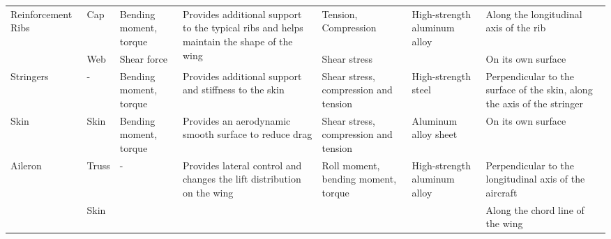 \begin{table}
{\begin{tabular}{lllllll}
    \midrule
    \multirow{2}{*}{Reinforcement Ribs} & Cap      & Bending moment, torque & \multirow{2}{*}{Provides additional support to the typical ribs and helps maintain the shape of the wing}              & Tension, Compression                                 & \multirow{2}{*}{High-strength aluminum alloy} & Along the longitudinal axis of the rib                                   \\
                                        & Web      & Shear force            &                                                                                                                        & Shear stress                                         &                                               & On its own surface                                                       \\
    \midrule
    Stringers                           & -        & Bending moment, torque & Provides additional support and stiffness to the skin                                                                  & Shear stress, compression and tension                & High-strength steel                           & Perpendicular to the surface of the skin, along the axis of the stringer \\
    \midrule
    Skin                                & Skin     & Bending moment, torque & Provides an aerodynamic smooth surface to reduce drag                                                                  & Shear stress, compression and tension                & Aluminum alloy sheet                          & On its own surface                                                       \\
    \midrule
    \multirow{2}{*}{Aileron}            & Truss    & \multirow{2}{*}{-}     & \multirow{2}{*}{Provides lateral control and changes the lift distribution on the wing}                                & \multirow{2}{*}{Roll moment, bending moment, torque} & \multirow{2}{*}{High-strength aluminum alloy} & Perpendicular to the longitudinal axis of the aircraft                   \\
                                        & Skin     &                        &                                                                                                                        &                                                      &                                               & Along the chord line of the wing      \\
                                        \bottomrule                                  
    \end{tabular}}
\end{table}

